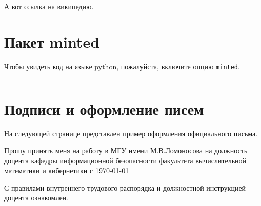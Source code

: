 \documentclass[colorthm, bib]{../civarticle}
\begin{document}
А вот ссылка на \href{https://ru.wikipedia.org}{википедию}.


\section{Пакет minted}
\label{sec:minted}

Чтобы увидеть код на языке python, пожалуйста, включите опцию \texttt{minted}.
\if \MINTED\empty
\else \inputminted{python}{code.py} \fi

\section{Подписи и оформление писем}\label{sec:example:sign}
На следующей странице представлен пример оформления официального
письма.

\newpage
\thispagestyle{empty}  %


\vspace{6\bigskipamount}


\vspace{3\bigskipamount}

\begin{spacing}{2} %
  \large Прошу принять меня на работу в МГУ имени М.В.Ломоносова на
  должность доцента кафедры информационной безопасности факультета
  вычислительной математики и кибернетики с \today

  С правилами внутреннего трудового распорядка и должностной
  инструкцией доцента ознакомлен.
\end{spacing}

\medskip


\vspace{4\bigskipamount}


\vspace{3\bigskipamount}

\newpage
\end{document}
